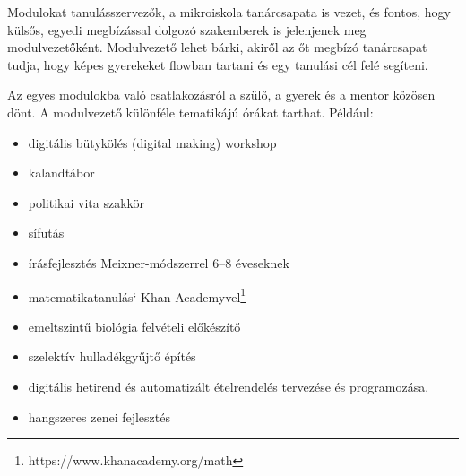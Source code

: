   Modulokat tanulásszervezők, a mikroiskola tanárcsapata is vezet, és fontos, hogy külsős, egyedi megbízással dolgozó szakemberek is jelenjenek meg modulvezetőként. Modulvezető lehet bárki, akiről az őt megbízó tanárcsapat tudja, hogy képes gyerekeket flowban tartani és egy tanulási cél felé segíteni.

  Az egyes modulokba való csatlakozásról a
  szülő, a gyerek és a mentor közösen dönt. A modulvezető különféle tematikájú
  órákat tarthat. Például:
  \begin{itemize}
  \item digitális bütykölés (digital making) workshop

  \item  kalandtábor

  \item  politikai vita szakkör

  \item  sífutás

  \item  írásfejlesztés Meixner-módszerrel 6–8 éveseknek

  \item  matematikatanulás` Khan Academyvel\footnote{https://www.khanacademy.org/math}

  \item emeltszintű biológia felvételi előkészítő
  \item  szelektív hulladékgyűjtő építés

  \item  digitális hetirend és automatizált ételrendelés tervezése és programozása.

  \item hangszeres zenei fejlesztés
\end{itemize}
